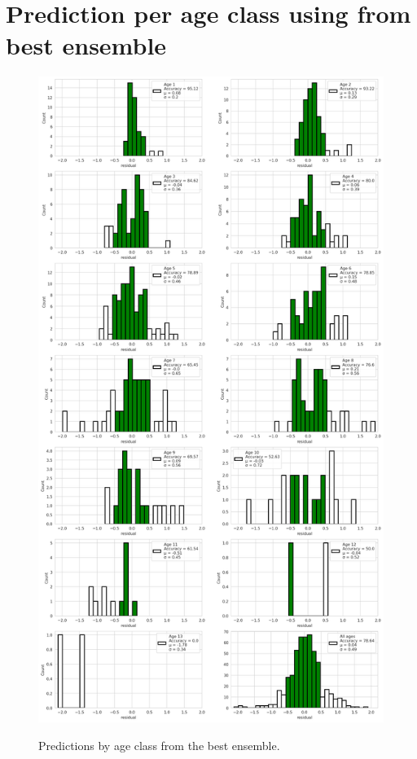 \documentclass[10pt,letterpaper]{article}
\begin{document}
\pagebreak
\section{Prediction per age class  using from best ensemble}
\centering
\begin{figure}[h!]
  \caption{Predictions by age class from the best ensemble.}
  \centering
  \includegraphics[scale=0.34]{results/eda/acc_by_age_dist_best_ensemble_hist2.png}
  \label{marker15}
\end{figure}
\end{document}
